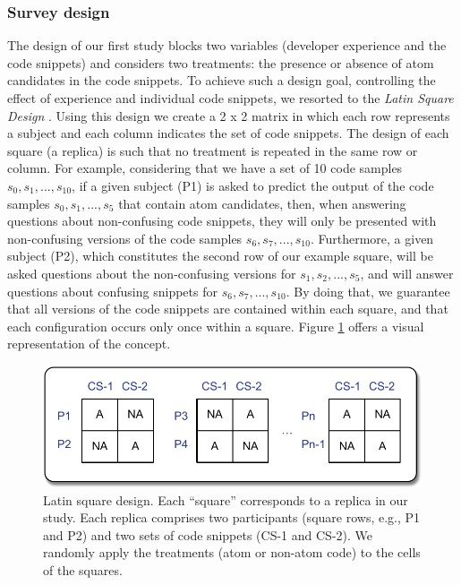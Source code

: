 \subsubsection*{Survey design} 

The design of our first study blocks two variables
(developer experience and the code snippets) and
considers two treatments: the presence or absence of 
atom candidates in the code snippets. 
To achieve such a design goal, controlling the effect of experience and individual code snippets, we resorted to the \textit{Latin Square Design} \cite{Hunter-Experimenters}. Using this design we create a 2 x 2 matrix in which each row represents a subject and each column indicates the set of code snippets. The design of each square (a replica) is such that no treatment is repeated in the same row or column. For example, considering that we have a set of 10
code samples $s_0, s_1, ..., s_{10}$, if a given subject (P1) is asked to predict the output of the code samples $s_0, s_1, ..., s_5$ that contain atom candidates, then, when answering questions about non-confusing code snippets, they will only be presented with non-confusing versions of the code samples $s_6, s_7,..., s_{10}$. Furthermore, a given subject (P2), which constitutes the second row of our example square, will be asked questions about the non-confusing versions for $s_1, s_2, ..., s_5$, and will answer questions about confusing snippets for $s_6, s_7,..., s_{10}$. By doing that, we guarantee that all versions of the code snippets are contained within each square, and that each configuration occurs only once within a square. Figure \ref{fig:latinsquare} offers a visual representation of the concept.

  \begin{figure}[htb!]
      \noindent
      \centering
      \includegraphics[scale=.50]{images/latin-square.pdf}
      \caption{Latin square design. Each ``square'' corresponds to 
      a replica in our study. Each replica comprises two participants (square rows, e.g., P1 and P2) 
      and two sets of code snippets (CS-1 and CS-2). We randomly apply the 
      treatments (atom or non-atom code) to the cells of the squares.} 
      \label{fig:latinsquare}
  \end{figure}


